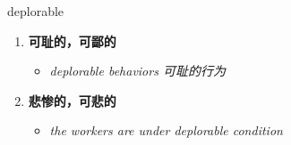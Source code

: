 
\begin{frame}
{\huge deplorable}
\begin{center}
\begin{enumerate}\Large
  \item \textbf{可耻的，可鄙的}
  \begin{itemize}
    \item \em{\Large{deplorable behaviors 可耻的行为}}
  \end{itemize}
  \item \textbf{悲惨的，可悲的}
  \begin{itemize}
    \item \em{\Large{the workers are under deplorable condition}}
  \end{itemize}
\end{enumerate}
\end{center}
\end{frame}
